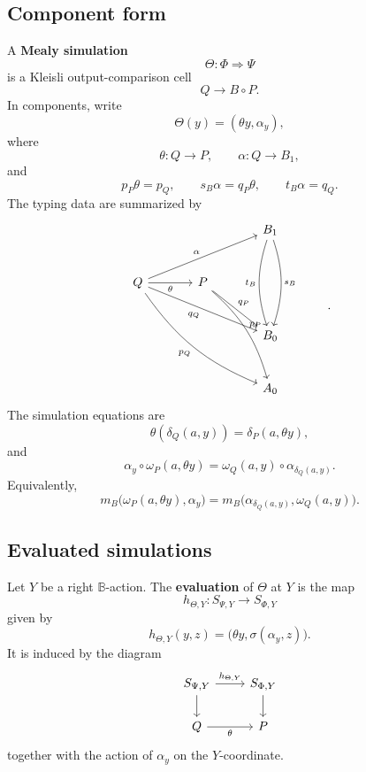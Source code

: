 \subsection{Component form}
\label{subsec:relative-simulation-component-form}

\begin{definition}
\label{def:relative-mealy-simulation-component}
A \textbf{Mealy simulation}
\[
\Theta:\Phi\Rightarrow\Psi
\]
is a Kleisli output-comparison cell
\[
Q\to B\circ P.
\]
In components, write
\[
\Theta(y)=(\theta y,\alpha_y),
\]
where
\[
\theta:Q\to P,
\qquad
\alpha:Q\to B_1,
\]
and
\[
p_P\theta=p_Q,
\qquad
s_B\alpha=q_P\theta,
\qquad
t_B\alpha=q_Q.
\]
The typing data are summarized by
\[
\begin{tikzcd}[column sep=large,row sep=large]
&& B_1
  \arrow[dd,bend left=18,"s_B"]
  \arrow[dd,bend right=18,"t_B"']
&
\\
Q
  \arrow[rru,"\alpha"]
  \arrow[r,"\theta"']
  \arrow[drr,"q_Q"']
  \arrow[ddrr,bend right=16,"p_Q"']
&
P
  \arrow[dr,"q_P"]
  \arrow[rdd,bend left=16,"p_P"]
&&
\\
&& B_0 &
\\
&& A_0 &
\end{tikzcd}
.
\]
The simulation equations are
\[
\theta(\delta_Q(a,y))
=
\delta_P(a,\theta y),
\]
and
\[
\alpha_y\circ \omega_P(a,\theta y)
=
\omega_Q(a,y)\circ \alpha_{\delta_Q(a,y)}.
\]
Equivalently,
\[
m_B\bigl(\omega_P(a,\theta y),\alpha_y\bigr)
=
m_B\bigl(\alpha_{\delta_Q(a,y)},\omega_Q(a,y)\bigr).
\]
\end{definition}

\subsection{Evaluated simulations}
\label{subsec:relative-evaluated-simulations}

\begin{definition}
\label{def:relative-evaluated-simulation-map}
Let \(Y\) be a right \(\mathbb B\)-action. The \textbf{evaluation} of
\(\Theta\) at \(Y\) is the map
\[
h_{\Theta,Y}:S_{\Psi,Y}\to S_{\Phi,Y}
\]
given by
\[
h_{\Theta,Y}(y,z)
=
\bigl(\theta y,\sigma(\alpha_y,z)\bigr).
\]
It is induced by the diagram
\[
\begin{tikzcd}
S_{\Psi,Y}
\arrow[r,"h_{\Theta,Y}"]
\arrow[d]
&
S_{\Phi,Y}
\arrow[d]
\\
Q
\arrow[r,"\theta"']
&
P
\end{tikzcd}
\]
together with the action of \(\alpha_y\) on the \(Y\)-coordinate.
\end{definition}

